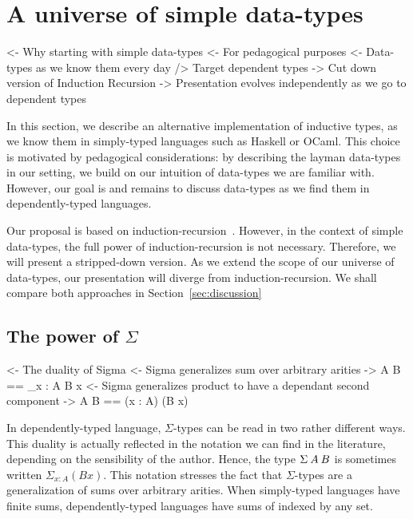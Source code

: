 \section{A universe of simple data-types}

\begin{wstructure}
<- Why starting with simple data-types
    <- For pedagogical purposes
        <- Data-types as we know them every day
        /> Target dependent types
    -> Cut down version of Induction Recursion
        -> Presentation evolves independently as we go to dependent types
\end{wstructure}

In this section, we describe an alternative implementation of
inductive types, as we know them in simply-typed languages such as
Haskell or OCaml. This choice is motivated by pedagogical
considerations: by describing the layman data-types in our setting, we
build on our intuition of data-types we are familiar with. However,
our goal is and remains to discuss data-types as we find them in
dependently-typed languages.

Our proposal is based on induction-recursion~\cite{dybjer:general-ir,
  dybjer:axiom-ir, dybjer:ir-initial-algebra, dybjer:iir}. However, in
the context of simple data-types, the full power of
induction-recursion is not necessary. Therefore, we will present a
stripped-down version. As we extend the scope of our universe of
data-types, our presentation will diverge from induction-recursion. We
shall compare both approaches in Section~\ref{sec:discussion}

\subsection{The power of $\Sigma$}

\begin{wstructure}
<- The duality of Sigma
    <- Sigma generalizes sum over arbitrary arities
        -> \Sigma A B == \Sigma_{x : A} B x
    <- Sigma generalizes product to have a dependant second component
        -> \Sigma A B == (x : A) \times (B x)
\end{wstructure}

In dependently-typed language, $\Sigma$-types can be read in two
rather different ways. This duality is actually reflected in the
notation we can find in the literature, depending on the sensibility
of the author. Hence, the type $\SigmaTy{A}{B}$ is sometimes written
$\Sigma_{x : A} (B x)$. This notation stresses the fact that
$\Sigma$-types are a generalization of sums over arbitrary
arities. When simply-typed languages have finite sums,
dependently-typed languages have sums of indexed by any set.

